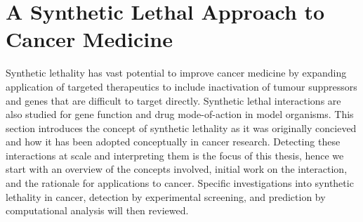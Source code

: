 
\section{A Synthetic Lethal Approach to Cancer Medicine}

Synthetic lethality has vast potential to improve cancer medicine by expanding application of targeted therapeutics to include inactivation of tumour suppressors and genes that are difficult to target directly. Synthetic lethal interactions are also studied for gene function and drug mode-of-action in model organisms. This section introduces the concept of synthetic lethality as it was originally concieved and how it has been adopted conceptually in cancer research. Detecting these interactions at scale and interpreting them is the focus of this thesis, hence we start with an overview of the concepts involved, initial work on the interaction, and the rationale for applications to cancer. Specific investigations into synthetic lethality in cancer, detection by experimental screening, and prediction by computational analysis will then reviewed.





